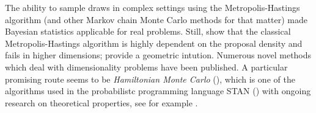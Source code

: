 The ability to sample draws in complex settings using the Metropolis-Hastings algorithm (and other Markov chain Monte Carlo methods for that matter) made Bayesian statistics applicable for real problems.
Still, \citet{Au2001EstimationOS} show that the classical Metropolis-Hastings algorithm is highly dependent on the proposal density and fails in higher dimensions; \citet{zuev08} provide a geometric intution.
Numerous novel methods which deal with dimensionality problems have been published.
A particular promising route seems to be \emph{Hamiltonian Monte Carlo} (\citet{duane87}), which is one of the algorithms used in the probabilistc programming language STAN (\citet{standev2018stancore}) with ongoing research on theoretical properties, see for example \citet{betancourt2014geometric}.


%
